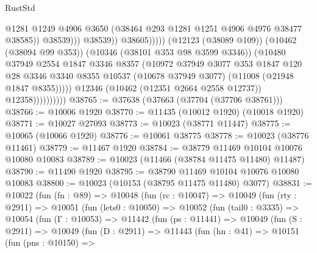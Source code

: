 \begin{lexlean}{RustStd}
\begin{coremodule}
                                                @1281
                                                @1249
                                                @4906
                                                @3650
                                                (@38464 @293 @1281 @1251 @4906 @4976 @38477 @38585))
                                              @38539)))
                                        @38539))
                                    @38605)))))
                          (@12123 (@38089 @109))
                          (@10462 (@38094 @99 @353))
                          (@10346 (@38101 @353 @98 @3599 @3346))
                          (@10480
                            @37949
                            @2554
                            @1847
                            @3346
                            @8357
                            (@10972
                              @37949
                              @3077
                              @353
                              @1847
                              @120
                              @28
                              @3346
                              @3340
                              @8355
                              @10537
                              (@10678 @37949 @3077)
                              (@11008 (@21948 @1847 @8355)))))
                        @12346
                        (@10462 (@12351 @2664 @2558 @12737))
                        @12358))))))))))
@38765 := @37638 (@37663 (@37704 (@37706 @38761)))
@38766 := @10006 @1920
@38770 := @11435 (@10012 @1920) (@10018 @1920)
@38771 := @10027 @27093
@38773 := @10023 (@38771 @11447)
@38775 := @10065 (@10066 @1920)
@38776 := @10061 @38775
@38778 := @10023 (@38776 @11461)
@38779 := @11467 @1920
@38784 := @38779 @11469 @10104 @10076 @10080 @10083
@38789 := @10023 (@11466 (@38784 @11475 @11480) @11487)
@38790 := @11490 @1920
@38795 := @38790 @11469 @10104 @10076 @10080 @10083
@38800 := @10023 (@10153 (@38795 @11475 @11480) @3077)
@38831 := @10022
    (fun (fn : @89) =>
    @10048
      (fun (rc : @10047) =>
      @10049
        (fun (rty : @2911) =>
        @10051
          (fun (lets0 : @10050) =>
          @10052
            (fun (tail0 : @3335) =>
            @10054
              (fun (Γ : @10053) =>
              @11442
                (fun (ps : @11441) =>
                @10049
                  (fun (S : @2911) =>
                  @10049
                    (fun (D : @2911) =>
                    @11443
                      (fun (hn : @41) =>
                      @10151
                        (fun (pns : @10150) =>

\end{coremodule}
\end{lexlean}
